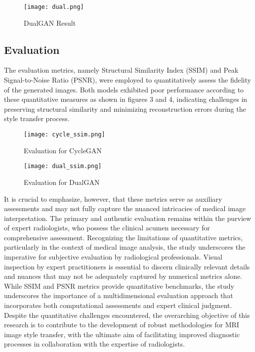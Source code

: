 \documentclass[conference]{IEEEtran}
\begin{document}
\begin{figure}[!ht]
  \centering
  \texttt{[image: dual.png]}
  \captionsetup{justification=centering}
  \caption{DualGAN Result}
  \label{fig:DualGAN Result}
\end{figure}

\subsection{Evaluation}
The evaluation metrics, namely Structural Similarity Index (SSIM) and Peak Signal-to-Noise Ratio (PSNR), were employed to quantitatively assess the fidelity of the generated images. Both models exhibited poor performance according to these quantitative measures as shown in figures 3 and 4, indicating challenges in preserving structural similarity and minimizing reconstruction errors during the style transfer process. 
\begin{figure}[!ht]
  \centering
  \texttt{[image: cycle\_ssim.png]}
  \captionsetup{justification=centering}
  \caption{Evaluation for CycleGAN}
  \label{fig:Evaluation for CycleGAN}
\end{figure}

\begin{figure}[!ht]
  \centering
  \texttt{[image: dual\_ssim.png]}
  \captionsetup{justification=centering}
  \caption{Evaluation for DualGAN}
  \label{fig:Evaluation for DualGAN}
\end{figure}

It is crucial to emphasize, however, that these metrics serve as auxiliary assessments and may not fully capture the nuanced intricacies of medical image interpretation. The primary and authentic evaluation remains within the purview of expert radiologists, who possess the clinical acumen necessary for comprehensive assessment. Recognizing the limitations of quantitative metrics, particularly in the context of medical image analysis, the study underscores the imperative for subjective evaluation by radiological professionals. Visual inspection by expert practitioners is essential to discern clinically relevant details and nuances that may not be adequately captured by numerical metrics alone. While SSIM and PSNR metrics provide quantitative benchmarks, the study underscores the importance of a multidimensional evaluation approach that incorporates both computational assessments and expert clinical judgment. Despite the quantitative challenges encountered, the overarching objective of this research is to contribute to the development of robust methodologies for MRI image style transfer, with the ultimate aim of facilitating improved diagnostic processes in collaboration with the expertise of radiologists.
\end{document}
